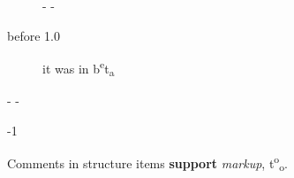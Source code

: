 \begin{description}\kern-\topsep
\makeatletter\advance\@topsepadd-\topsep\makeatother%
\item[before 1.0]{it was in b\textsuperscript{e}t\textsubscript{a}

}\end{description}%
\begin{description}\kern-\topsep
\makeatletter\advance\@topsepadd-\topsep\makeatother%
\item[version]{-1}\end{description}%
\label{page-test+u+package+++ml-module-Markup-val-foo}\begin{ocamlindent}Comments in structure items \textbf{support} \emph{markup}, t\textsuperscript{o}\textsubscript{o}.\end{ocamlindent}%
\medbreak


